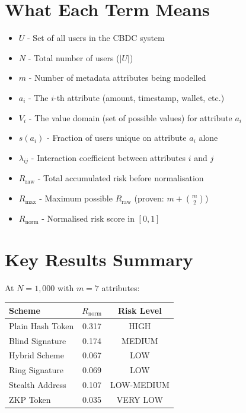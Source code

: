 \documentclass[12pt,a4paper,oneside,openany]{report}
\begin{document}
\section{What Each Term Means}
\label{sec:terms}

\begin{itemize}
    \item $U$ - Set of all users in the CBDC system
    \item $N$ - Total number of users ($|U|$)
    \item $m$ - Number of metadata attributes being modelled
    \item $a_i$ - The $i$-th attribute (amount, timestamp, wallet, etc.)
    \item $V_i$ - The value domain (set of possible values) for attribute $a_i$
    \item $s(a_i)$ - Fraction of users unique on attribute $a_i$ alone
    \item $\lambda_{ij}$ - Interaction coefficient between attributes $i$ and $j$
    \item $R_{\mathrm{raw}}$ - Total accumulated risk before normalisation
    \item $R_{\mathrm{max}}$ - Maximum possible $R_{\mathrm{raw}}$ (proven: $m + \binom{m}{2}$)
    \item $R_{\mathrm{norm}}$ - Normalised risk score in $[0, 1]$
\end{itemize}

\section{Key Results Summary}
\label{sec:results}

At $N = 1,000$ with $m = 7$ attributes:

\begin{tabular}{lcc}
\textbf{Scheme} & $R_{\mathrm{norm}}$ & \textbf{Risk Level} \\
\hline
Plain Hash Token & 0.317 & HIGH \\
Blind Signature & 0.174 & MEDIUM \\
Hybrid Scheme & 0.067 & LOW \\
Ring Signature & 0.069 & LOW \\
Stealth Address & 0.107 & LOW-MEDIUM \\
ZKP Token & 0.035 & VERY LOW \\
\end{tabular}
\end{document}
